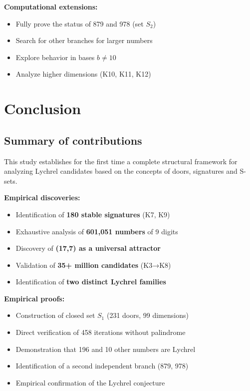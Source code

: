 \documentclass[12pt,a4paper]{article}
\theoremstyle{remark}
\begin{document}
\textbf{Computational extensions:}
\begin{itemize}
\item Fully prove the status of 879 and 978 (set $S_2$)
\item Search for other branches for larger numbers
\item Explore behavior in bases $b \neq 10$
\item Analyze higher dimensions (K10, K11, K12)
\end{itemize}


\section{Conclusion}
\label{sec:conclusion_en}

\subsection{Summary of contributions}

This study establishes for the first time a complete structural framework for analyzing Lychrel candidates based on the concepts of doors, signatures and S-sets.

\textbf{Empirical discoveries:}
\begin{itemize}
\item Identification of \textbf{180 stable signatures} (K7, K9)
\item Exhaustive analysis of \textbf{601,051 numbers} of 9 digits
\item Discovery of \textbf{(17,7) as a universal attractor}
\item Validation of \textbf{35+ million candidates} (K3→K8)
\item Identification of \textbf{two distinct Lychrel families}
\end{itemize}

\textbf{Empirical proofs:}
\begin{itemize}
\item Construction of closed set $S_1$ (231 doors, 99 dimensions)
\item Direct verification of 458 iterations without palindrome
\item Demonstration that 196 and 10 other numbers are Lychrel
\item Identification of a second independent branch (879, 978)
\item Empirical confirmation of the Lychrel conjecture
\end{itemize}
\end{document}
